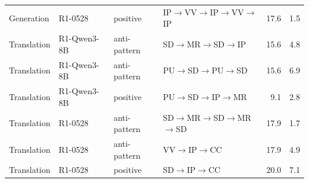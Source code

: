 \begin{table}[t]
\begin{tabular}{llllrr}
Generation & R1-0528 & positive & IP$\rightarrow$VV$\rightarrow$IP$\rightarrow$VV$\rightarrow$IP & 17.6 & 1.5 \\
Translation & R1-Qwen3-8B & anti-pattern & SD$\rightarrow$MR$\rightarrow$SD$\rightarrow$IP & 15.6 & 4.8 \\
Translation & R1-Qwen3-8B & anti-pattern & PU$\rightarrow$SD$\rightarrow$PU$\rightarrow$SD & 15.6 & 6.9 \\
Translation & R1-Qwen3-8B & positive & PU$\rightarrow$SD$\rightarrow$IP$\rightarrow$MR & 9.1 & 2.8 \\
Translation & R1-0528 & anti-pattern & SD$\rightarrow$MR$\rightarrow$SD$\rightarrow$MR$\rightarrow$SD & 17.9 & 1.7 \\
Translation & R1-0528 & anti-pattern & VV$\rightarrow$IP$\rightarrow$CC & 17.9 & 4.9 \\
Translation & R1-0528 & positive & SD$\rightarrow$IP$\rightarrow$CC & 20.0 & 7.1 \\
\bottomrule
\end{tabular}
\end{table}
